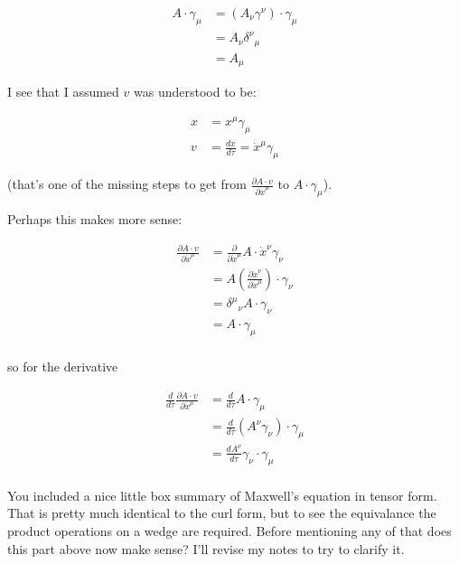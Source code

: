 \documentclass{article}      %
\newcommand{\PD}[2]{\frac{\partial {#2}}{\partial {#1}}}
\newcommand{\xdot}[0]{\dot{x}}
\begin{document}
\begin{align*}
A \cdot \gamma_\mu 
&= \left( A_\nu \gamma^\nu \right) \cdot \gamma_\mu \\
&= A_\nu {\delta^\nu}_\mu \\
&= A_\mu
\end{align*}

I see that I assumed $v$ was understood to be:

\begin{align*}
x &= x^\mu \gamma_\mu \\
v &= \frac{dx}{d\tau} = \xdot^\mu \gamma_\mu
\end{align*}

(that's one of the missing steps to get from $\PD{\xdot^\mu}{A \cdot v}$ to $A \cdot \gamma_\mu$).

Perhaps this makes more sense:

\begin{align*}
\PD{\xdot^\mu}{A \cdot v} 
&= \PD{\xdot^\mu}{} A \cdot \xdot^\nu \gamma_\nu \\
&= A \left( \PD{\xdot^\mu}{\xdot^\nu} \right) \cdot \gamma_\nu \\
&= {\delta^\mu}_\nu A \cdot \gamma_\nu \\
&= A \cdot \gamma_\mu \\
\end{align*}

so for the derivative

\begin{align*}
\frac{d}{d\tau} \PD{\xdot^\mu}{A \cdot v} 
&= \frac{d}{d\tau} A \cdot \gamma_\mu \\
&= \frac{d}{d\tau} (A^\nu \gamma_\nu) \cdot \gamma_\mu \\
&= \frac{dA^\nu}{d\tau} \gamma_\nu \cdot \gamma_\mu \\
\end{align*}

You included a nice little box summary of Maxwell's equation in tensor form.  That is pretty much identical to the curl
form, but to see the equivalance the product operations on a wedge are required.  Before mentioning any of that does this
part above now make sense?  I'll revise my notes to try to clarify it.

\end{document}
